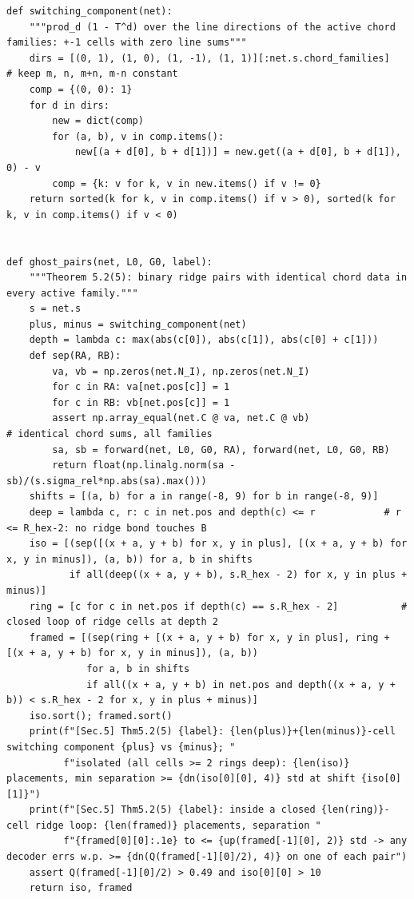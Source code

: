 \documentclass[11pt,a4paper]{article}
\theoremstyle{definition}
\theoremstyle{remark}
\begin{document}
\begin{lstlisting}
def switching_component(net):
    """prod_d (1 - T^d) over the line directions of the active chord families: +-1 cells with zero line sums"""
    dirs = [(0, 1), (1, 0), (1, -1), (1, 1)][:net.s.chord_families]   # keep m, n, m+n, m-n constant
    comp = {(0, 0): 1}
    for d in dirs:
        new = dict(comp)
        for (a, b), v in comp.items():
            new[(a + d[0], b + d[1])] = new.get((a + d[0], b + d[1]), 0) - v
        comp = {k: v for k, v in new.items() if v != 0}
    return sorted(k for k, v in comp.items() if v > 0), sorted(k for k, v in comp.items() if v < 0)


def ghost_pairs(net, L0, G0, label):
    """Theorem 5.2(5): binary ridge pairs with identical chord data in every active family."""
    s = net.s
    plus, minus = switching_component(net)
    depth = lambda c: max(abs(c[0]), abs(c[1]), abs(c[0] + c[1]))
    def sep(RA, RB):
        va, vb = np.zeros(net.N_I), np.zeros(net.N_I)
        for c in RA: va[net.pos[c]] = 1
        for c in RB: vb[net.pos[c]] = 1
        assert np.array_equal(net.C @ va, net.C @ vb)                  # identical chord sums, all families
        sa, sb = forward(net, L0, G0, RA), forward(net, L0, G0, RB)
        return float(np.linalg.norm(sa - sb)/(s.sigma_rel*np.abs(sa).max()))
    shifts = [(a, b) for a in range(-8, 9) for b in range(-8, 9)]
    deep = lambda c, r: c in net.pos and depth(c) <= r            # r <= R_hex-2: no ridge bond touches B
    iso = [(sep([(x + a, y + b) for x, y in plus], [(x + a, y + b) for x, y in minus]), (a, b)) for a, b in shifts
           if all(deep((x + a, y + b), s.R_hex - 2) for x, y in plus + minus)]
    ring = [c for c in net.pos if depth(c) == s.R_hex - 2]           # closed loop of ridge cells at depth 2
    framed = [(sep(ring + [(x + a, y + b) for x, y in plus], ring + [(x + a, y + b) for x, y in minus]), (a, b))
              for a, b in shifts
              if all((x + a, y + b) in net.pos and depth((x + a, y + b)) < s.R_hex - 2 for x, y in plus + minus)]
    iso.sort(); framed.sort()
    print(f"[Sec.5] Thm5.2(5) {label}: {len(plus)}+{len(minus)}-cell switching component {plus} vs {minus}; "
          f"isolated (all cells >= 2 rings deep): {len(iso)} placements, min separation >= {dn(iso[0][0], 4)} std at shift {iso[0][1]}")
    print(f"[Sec.5] Thm5.2(5) {label}: inside a closed {len(ring)}-cell ridge loop: {len(framed)} placements, separation "
          f"{framed[0][0]:.1e} to <= {up(framed[-1][0], 2)} std -> any decoder errs w.p. >= {dn(Q(framed[-1][0]/2), 4)} on one of each pair")
    assert Q(framed[-1][0]/2) > 0.49 and iso[0][0] > 10
    return iso, framed





\end{lstlisting}
\end{document}
